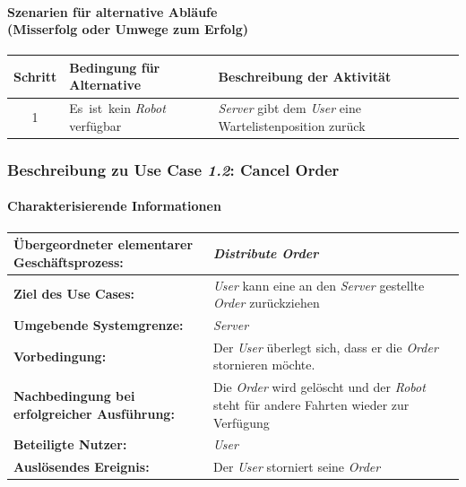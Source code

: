 			\paragraph*{Szenarien für alternative Abläufe\\ (Misserfolg oder Umwege zum Erfolg)}

			\begin{table}[H]
					\centering
					\begin{tabularx}{\textwidth}{|c|p{2cm}|X|}
					\hline
					Schritt & Bedingung für Alternative & Beschreibung der Aktivität \\ \hline
					1 & \mbox{Es ist kein} \emph{Robot} verfügbar & \emph{Server} gibt dem \emph{User} eine Wartelistenposition zurück \\
					\hline
					\end{tabularx}
				\end{table}


			\pagebreak

			\subsubsection{Beschreibung zu Use Case \emph{1.2}: Cancel Order}
			\paragraph*{Charakterisierende Informationen}

			\begin{table}[H]
				\centering
				\begin{tabularx}{\textwidth}{|p{5cm}|X|}
					\hline
					\textbf{Übergeordneter elementarer Geschäftsprozess:} & \emph{Distribute Order} \\ \hline
					\textbf{Ziel des Use Cases:} & \emph{User} kann eine an den \emph{Server} gestellte \emph{Order} zurückziehen \\ \hline
					\textbf{Umgebende Systemgrenze:} & \emph{Server} \\ \hline
					\textbf{Vorbedingung:} & Der \emph{User} überlegt sich, dass er die \emph{Order} stornieren möchte. \\ \hline
					\textbf{Nachbedingung bei erfolgreicher Ausführung:} & Die \emph{Order} wird gelöscht und der \emph{Robot} steht für andere Fahrten wieder zur Verfügung \\ \hline
					\textbf{Beteiligte Nutzer:} & \emph{User} \\ \hline
					\textbf{Auslösendes Ereignis:} & Der \emph{User} storniert seine \emph{Order} \\
					\hline
				\end{tabularx}
			\end{table}

